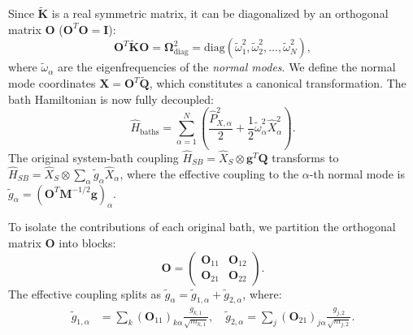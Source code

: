 \documentclass[aps,pra,reprint,amsmath,amssymb,superscriptaddress]{revtex4-2}
\begin{document}
Since $\tilde{\mathbf{K}}$ is a real symmetric matrix, it can be diagonalized by an orthogonal matrix $\mathbf{O}$ ($\mathbf{O}^T \mathbf{O} = \mathbf{I}$):
\begin{equation}
\mathbf{O}^T \tilde{\mathbf{K}} \mathbf{O} = \mathbf{\Omega}_{\text{diag}}^2 = \text{diag}(\tilde{\omega}_1^2, \tilde{\omega}_2^2, \dots, \tilde{\omega}_N^2),
\label{eq:diagonalization}
\end{equation}
where $\tilde{\omega}_\alpha$ are the eigenfrequencies of the \textit{normal modes}. We define the normal mode coordinates $\mathbf{X} = \mathbf{O}^T \tilde{\mathbf{Q}}$, which constitutes a canonical transformation. The bath Hamiltonian is now fully decoupled:
\begin{equation}
\hat{H}_{\text{baths}} = \sum_{\alpha=1}^{N} \left( \frac{\hat{P}_{X,\alpha}^2}{2} + \frac{1}{2} \tilde{\omega}_\alpha^2 \hat{X}_\alpha^2 \right).
\label{eq:H_normal_modes}
\end{equation}
The original system-bath coupling $\hat{H}_{SB} = \hat{X}_S \otimes \mathbf{g}^T \mathbf{Q}$ transforms to $\hat{H}_{SB} = \hat{X}_S \otimes \sum_\alpha \tilde{g}_\alpha \hat{X}_\alpha$, where the effective coupling to the $\alpha$-th normal mode is $\tilde{g}_\alpha = (\mathbf{O}^T \mathbf{M}^{-1/2} \mathbf{g})_\alpha$. 

To isolate the contributions of each original bath, we partition the orthogonal matrix $\mathbf{O}$ into blocks:
\begin{equation}
\mathbf{O} = \left(\begin{array}{cc} \mathbf{O}_{11} & \mathbf{O}_{12} \\ \mathbf{O}_{21} & \mathbf{O}_{22} \end{array}\right).
\label{eq:O_partition}
\end{equation}
The effective coupling splits as $\tilde{g}_\alpha = \tilde{g}_{1,\alpha} + \tilde{g}_{2,\alpha}$, where:
\begin{align}
\tilde{g}_{1,\alpha} &= \sum_{k} (\mathbf{O}_{11})_{k\alpha} \frac{g_{k,1}}{\sqrt{m_{k,1}}}, \quad
\tilde{g}_{2,\alpha} = \sum_{j} (\mathbf{O}_{21})_{j\alpha} \frac{g_{j,2}}{\sqrt{m_{j,2}}}.
\label{eq:g_split}
\end{align}
\end{document}
